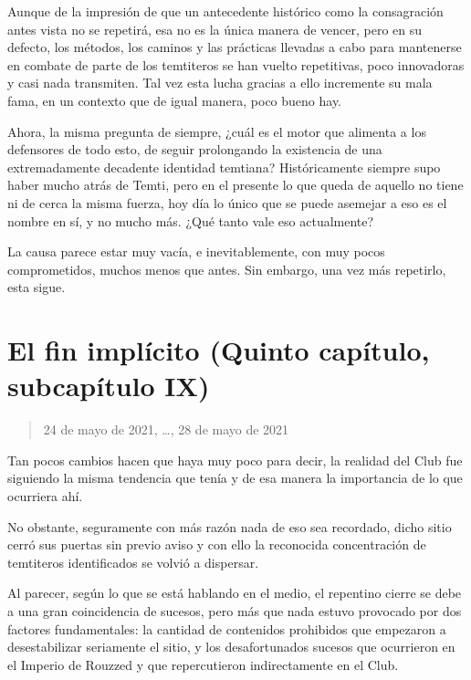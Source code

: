 \documentclass[
  spanish,
]{book}
\begin{document}
Aunque de la impresión de que un antecedente histórico como la consagración antes vista no se repetirá, esa no es la única manera de vencer, pero en su defecto, los métodos, los caminos y las prácticas llevadas a cabo para mantenerse en combate de parte de los temtiteros se han vuelto repetitivas, poco innovadoras y casi nada transmiten. Tal vez esta lucha gracias a ello incremente su mala fama, en un contexto que de igual manera, poco bueno hay.

Ahora, la misma pregunta de siempre, ¿cuál es el motor que alimenta a los defensores de todo esto, de seguir prolongando la existencia de una extremadamente decadente identidad temtiana?
Históricamente siempre supo haber mucho atrás de Temti, pero en el presente lo que queda de aquello no tiene ni de cerca la misma fuerza, hoy día lo único que se puede asemejar a eso es el nombre en sí, y no mucho más. ¿Qué tanto vale eso actualmente?

La causa parece estar muy vacía, e inevitablemente, con muy pocos comprometidos, muchos menos que antes. Sin embargo, una vez más repetirlo, esta sigue.

\hypertarget{el-fin-impluxedcito-quinto-capuxedtulo-subcapuxedtulo-ix}{%
\section{El fin implícito (Quinto capítulo, subcapítulo IX)}\label{el-fin-impluxedcito-quinto-capuxedtulo-subcapuxedtulo-ix}}

\begin{quote}
24 de mayo de 2021, \ldots, 28 de mayo de 2021
\end{quote}

Tan pocos cambios hacen que haya muy poco para decir, la realidad del Club fue siguiendo la misma tendencia que tenía y de esa manera la importancia de lo que ocurriera ahí.

No obstante, seguramente con más razón nada de eso sea recordado, dicho sitio cerró sus puertas sin previo aviso y con ello la reconocida concentración de temtiteros identificados se volvió a dispersar.

Al parecer, según lo que se está hablando en el medio, el repentino cierre se debe a una gran coincidencia de sucesos, pero más que nada estuvo provocado por dos factores fundamentales: la cantidad de contenidos prohibidos que empezaron a desestabilizar seriamente el sitio, y los desafortunados sucesos que ocurrieron en el Imperio de Rouzzed y que repercutieron indirectamente en el Club.
\end{document}
